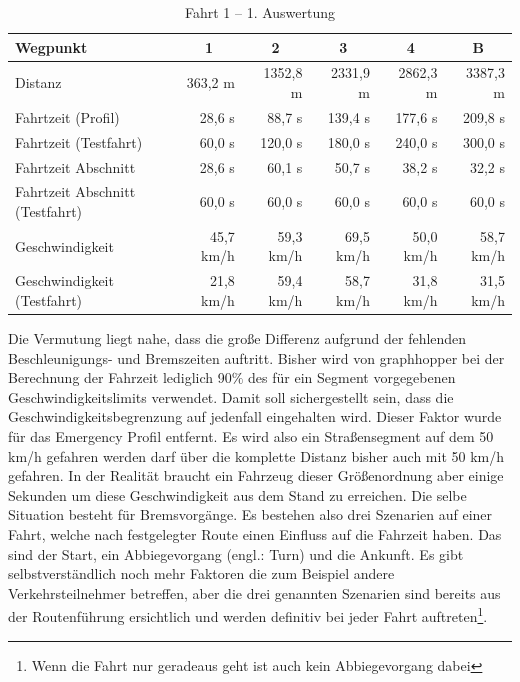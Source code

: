 \begin{table}[]
\centering
\caption{Fahrt 1 -- 1. Auswertung}
\label{tab:driveinit}
\begin{tabular}{|l|r|r|r|r|r|}
\hline
Wegpunkt                               & \multicolumn{1}{c|}{1} & \multicolumn{1}{c|}{2} & \multicolumn{1}{c|}{3} & \multicolumn{1}{c|}{4} & \multicolumn{1}{c|}{B}  \\ \hline
Distanz                                & 363,2 m                & 1352,8 m               & 2331,9 m               & 2862,3 m               & 3387,3 m               \\ \hline
Fahrtzeit (Profil)                     & 28,6 s                 & 88,7 s                 & 139,4 s                & 177,6 s                & 209,8 s                \\ \hline
Fahrtzeit (Testfahrt)                  & 60,0 s                 & 120,0 s                & 180,0 s                & 240,0 s                & 300,0 s                \\ \hline
Fahrtzeit Abschnitt                    & 28,6 s                 & 60,1 s                 & 50,7 s                 & 38,2 s                 & 32,2 s                 \\ \hline
Fahrtzeit Abschnitt (Testfahrt)        & 60,0 s                 & 60,0 s                 & 60,0 s                 & 60,0 s                 & 60,0 s                 \\ \hline
Geschwindigkeit                        & 45,7 km/h              & 59,3 km/h              & 69,5 km/h              & 50,0 km/h              & 58,7 km/h              \\ \hline
Geschwindigkeit (Testfahrt)            & 21,8 km/h              & 59,4 km/h              & 58,7 km/h              & 31,8 km/h              & 31,5 km/h              \\ \hline
\end{tabular}
\end{table}

Die Vermutung liegt nahe, dass die große Differenz aufgrund der fehlenden Beschleunigungs- und Bremszeiten auftritt. Bisher wird von graphhopper bei der Berechnung der Fahrzeit lediglich 90$\%$ des für ein Segment vorgegebenen Geschwindigkeitslimits verwendet. Damit soll sichergestellt sein, dass die Geschwindigkeitsbegrenzung auf jedenfall eingehalten wird. Dieser Faktor wurde für das Emergency Profil entfernt.
Es wird also ein Straßensegment auf dem 50 km/h gefahren werden darf über die komplette Distanz bisher auch mit 50 km/h gefahren.
In der Realität braucht ein Fahrzeug dieser Größenordnung aber einige Sekunden um diese Geschwindigkeit aus dem Stand zu erreichen. Die selbe Situation besteht für Bremsvorgänge.
Es bestehen also drei Szenarien auf einer Fahrt, welche nach festgelegter Route einen Einfluss auf die Fahrzeit haben. Das sind der Start, ein Abbiegevorgang (engl.: Turn) und die Ankunft. Es gibt selbstverständlich noch mehr Faktoren die zum Beispiel andere Verkehrsteilnehmer betreffen, aber die drei genannten Szenarien sind bereits aus der Routenführung ersichtlich und werden definitiv bei jeder Fahrt auftreten\footnote{Wenn die Fahrt nur geradeaus geht ist auch kein Abbiegevorgang dabei}.

